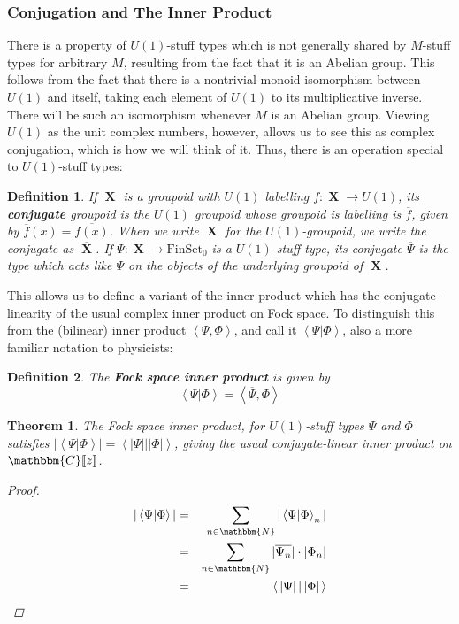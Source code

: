 \documentclass{amsart} \usepackage{amsmath,amssymb,bbm}
\newcommand{\opname}[1]{\operatorname{#1}}
\newtheorem{definition}{Definition}
\newcommand{\catname}[1]{\boldsymbol{\opname{{#1}}}}
\newcommand{\FSN}{\catname{FinSet_0}}
\newcommand{\Cz}{\mathbbm{C}[\![z]\!]}
\newcommand{\inprod}[1]{\left\langle{#1}\right\rangle}
\newtheorem{theorem}{Theorem}
\begin{document}
\subsubsection{Conjugation and The Inner Product}

There is a property of $U(1)$-stuff types which is not generally
shared by $M$-stuff types for arbitrary $M$, resulting from the fact
that it is an Abelian group.  This follows from the fact that there is
a nontrivial monoid isomorphism between $U(1)$ and itself, taking each
element of $U(1)$ to its multiplicative inverse.  There will be such
an isomorphism whenever $M$ is an Abelian group.  Viewing $U(1)$ as
the unit complex numbers, however, allows us to see this as complex
conjugation, which is how we will think of it.  Thus, there is an
operation special to $U(1)$-stuff types:

\begin{definition} If $\catname{X}$ is a groupoid with $U(1)$
labelling $f:\catname{X}\rightarrow U(1)$, its \textbf{conjugate}
groupoid is the $U(1)$ groupoid whose groupoid is labelling is
$\overline{f}$, given by $\overline{f}(x)=\overline{f(x)}$.  When we
write $\catname{X}$ for the $U(1)$-groupoid, we write the conjugate as
$\overline{\catname{X}}$.  If $\Psi:\catname{X} \rightarrow \FSN$ is a
$U(1)$-stuff type, its conjugate $\overline{\Psi}$ is the type which
acts like $\Psi$ on the objects of the underlying groupoid of
$\catname{X}$.
\end{definition}

This allows us to define a variant of the inner product which has the
conjugate-linearity of the usual complex inner product on Fock space.
To distinguish this from the (bilinear) inner product
$\inprod{\Psi,\Phi}$, and call it $\inprod{ \Psi | \Phi }$, also a
more familiar notation to physicists:

\begin{definition}
The \textbf{Fock space inner product} is given by 
\begin{equation}
\inprod{ \Psi | \Phi } = \inprod{ \overline{\Psi} , \Phi }
\end{equation}
\end{definition}

\begin{theorem} The Fock space inner product, for $U(1)$-stuff types
$\Psi$ and $\Phi$ satisfies $|\inprod{\Psi | \Phi}| =
\inprod{|\Psi| | |\Phi|}$, giving the usual conjugate-linear inner
product on $\Cz$.
\begin{proof}
\begin{eqnarray}
|\inprod{\Psi | \Phi}| & = & \sum_{n\in\mathbbm{N}} |\inprod{\Psi | \Phi}_n|\\
   \nonumber & = & \sum_{n\in\mathbbm{N}} |\overline{\Psi_n}| \cdot |\Phi_n|\\
   \nonumber & = & \inprod{\,|\Psi|\, |\, |\Phi|\,}
\end{eqnarray}
\end{proof}
\end{theorem}
\end{document}
